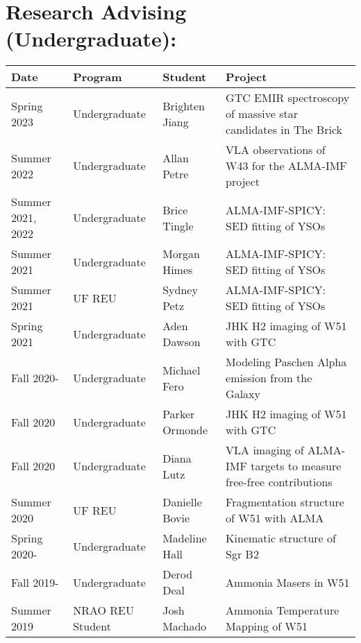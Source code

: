 \begin{minipage}{\textwidth}
\section*{Research Advising (Undergraduate): }
\vspace{-12pt}
\begin{tabular}{p{0.85in}p{1.3in}lp{2.6in}}
    Date  & Program & Student &  Project \\
    \hline
    Spring 2023 & Undergraduate &                               Brighten Jiang    &  GTC EMIR spectroscopy of massive star candidates in The Brick \\
    Summer 2022 & Undergraduate &                               Allan Petre    &  VLA observations of W43 for the ALMA-IMF project \\
    Summer 2021, 2022 & Undergraduate &                         Brice Tingle    &  ALMA-IMF-SPICY: SED fitting of YSOs \\
    Summer 2021 & Undergraduate &                               Morgan Himes    &  ALMA-IMF-SPICY: SED fitting of YSOs \\
    Summer 2021 & UF REU &                                      Sydney Petz    &  ALMA-IMF-SPICY: SED fitting of YSOs \\
    Spring 2021 & Undergraduate &                               Aden Dawson    &  JHK H2 imaging of W51 with GTC \\
    Fall 2020- & Undergraduate &                               Michael Fero    &  Modeling Paschen Alpha emission from the Galaxy \\
    Fall 2020 & Undergraduate &                               Parker Ormonde    &  JHK H2 imaging of W51 with GTC \\
    Fall 2020 & Undergraduate &                               Diana Lutz    &  VLA imaging of ALMA-IMF targets to measure free-free contributions \\
    Summer 2020 & UF REU &                               Danielle Bovie    &  Fragmentation structure of W51 with ALMA \\
    Spring 2020- & Undergraduate &                               Madeline Hall    &  Kinematic structure of Sgr B2 \\
    Fall 2019- & Undergraduate &                               Derod Deal    &  Ammonia Masers in W51 \\
    Summer 2019 & NRAO REU Student &                                              Josh Machado    &  Ammonia Temperature Mapping of W51 \\

\end{tabular}
\end{minipage}
